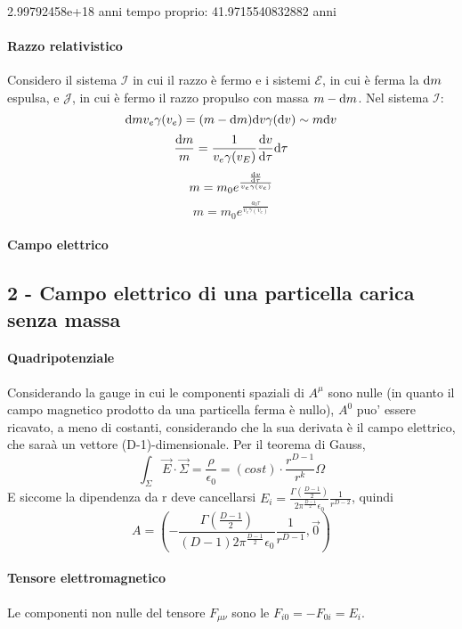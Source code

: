 2.99792458e+18  anni
tempo proprio:
41.9715540832882 anni




\paragraph{Razzo relativistico}
Considero il sistema $\mathcal{I}$ in cui il razzo \`e fermo e i sistemi $\mathcal{E}$, in cui \`e ferma la $\mathrm{d} m$ espulsa, e $\mathcal{J}$, in cui \`e fermo il razzo propulso con massa $m-\mathrm{d} m$. Nel sistema $\mathcal{I}$:
\[ \mathrm{d} m v_e \gamma(v_e) = (m - \mathrm{d} m) \mathrm{d} v \gamma(\mathrm{d} v) \sim m \mathrm{d} v \]
\[ \frac{\mathrm{d} m}{m} = \frac{1}{v_e \gamma(v_E)} \frac{\mathrm{d} v}{\mathrm{d}\tau} \mathrm{d}\tau \]
\[ m = m_0 e^{\frac{\frac{\mathrm{d} v}{\mathrm{d}\tau}}{v_e \gamma(v_e) }} \]
\[ m = m_0 e^{\frac{a_0\tau}{v_e \gamma(v_e) }} \]

\paragraph{Campo elettrico}





\subsection{2 - Campo elettrico di una particella carica senza massa}
\paragraph{Quadripotenziale}
Considerando la gauge in cui le componenti spaziali di $A^\mu$ sono nulle (in quanto il campo magnetico prodotto da una particella ferma \`e nullo), $A^0$ puo' essere ricavato, a meno di costanti, considerando che la sua derivata \`e il campo elettrico, che sara\`a un vettore (D-1)-dimensionale. Per il teorema di Gauss,
\[ \int_\Sigma \vec{E}\cdot\vec{\Sigma} = \frac{\rho}{\epsilon_0} =  (cost) \cdot \frac{r^{D-1}}{r^k}\Omega \]
E siccome la dipendenza da r deve cancellarsi \( E_i = \frac{\Gamma(\frac{D-1}{2})}{2\pi^{\frac{D-1}{2}}\epsilon_0} \frac{1}{r^{D-2}} \), quindi
\[ A = (-\frac{\Gamma(\frac{D-1}{2})}{(D-1)2\pi^{\frac{D-1}{2}}\epsilon_0} \frac{1}{r^{D-1}},\vec{0}) \]
\paragraph{Tensore elettromagnetico}
Le componenti non nulle del tensore $F_{\mu\nu}$ sono le $F_{i0}=-F_{0i}=E_i$.

